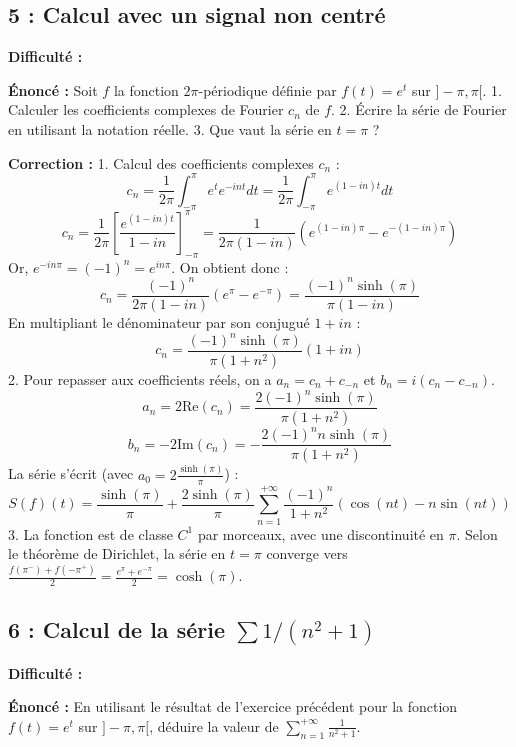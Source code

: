 \documentclass[12pt,a4paper]{article}
\begin{document}
\subsection*{5 : Calcul avec un signal non centré}

\textbf{Difficulté :} \bigstar\bigstar\bigstar\star\star

\textbf{Énoncé :}
Soit $f$ la fonction $2\pi$-périodique définie par $f(t) = e^t$ sur $]-\pi, \pi[$.
1. Calculer les coefficients complexes de Fourier $c_n$ de $f$.
2. Écrire la série de Fourier en utilisant la notation réelle.
3. Que vaut la série en $t=\pi$ ?

\textbf{Correction :}
1. Calcul des coefficients complexes $c_n$ :
   $$c_n = \frac{1}{2\pi} \int_{-\pi}^\pi e^t e^{-int} dt = \frac{1}{2\pi} \int_{-\pi}^\pi e^{(1-in)t} dt$$
   $$c_n = \frac{1}{2\pi} \left[ \frac{e^{(1-in)t}}{1-in} \right]_{-\pi}^\pi = \frac{1}{2\pi (1-in)} (e^{(1-in)\pi} - e^{-(1-in)\pi})$$
   Or, $e^{-in\pi} = (-1)^n = e^{in\pi}$. On obtient donc :
   $$c_n = \frac{(-1)^n}{2\pi (1-in)} (e^\pi - e^{-\pi}) = \frac{(-1)^n \sinh(\pi)}{\pi (1-in)}$$
   En multipliant le dénominateur par son conjugué $1+in$ :
   $$c_n = \frac{(-1)^n \sinh(\pi)}{\pi (1+n^2)} (1+in)$$
2. Pour repasser aux coefficients réels, on a $a_n = c_n + c_{-n}$ et $b_n = i(c_n - c_{-n})$.
   $$a_n = 2 \text{Re}(c_n) = \frac{2(-1)^n \sinh(\pi)}{\pi (1+n^2)}$$
   $$b_n = -2 \text{Im}(c_n) = -\frac{2(-1)^n n \sinh(\pi)}{\pi (1+n^2)}$$
   La série s'écrit (avec $a_0 = 2\frac{\sinh(\pi)}{\pi}$) :
   $$S(f)(t) = \frac{\sinh(\pi)}{\pi} + \frac{2\sinh(\pi)}{\pi} \sum_{n=1}^{+\infty} \frac{(-1)^n}{1+n^2} (\cos(nt) - n \sin(nt))$$
3. La fonction est de classe $C^1$ par morceaux, avec une discontinuité en $\pi$. Selon le théorème de Dirichlet, la série en $t=\pi$ converge vers $\frac{f(\pi^-) + f(-\pi^+)}{2} = \frac{e^\pi + e^{-\pi}}{2} = \cosh(\pi)$.


\subsection*{6 : Calcul de la série $\sum 1/(n^2+1)$}

\textbf{Difficulté :} \bigstar\bigstar\bigstar\star\star

\textbf{Énoncé :}
En utilisant le résultat de l'exercice précédent pour la fonction $f(t)=e^t$ sur $]-\pi, \pi[$, déduire la valeur de $\sum_{n=1}^{+\infty} \frac{1}{n^2+1}$.
\end{document}
